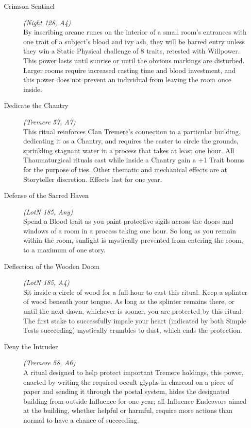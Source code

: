\begin{description}
	\item[Crimson Sentinel] \emph{(Night 128, A4)} \hfill \\
	By inscribing arcane runes on the interior of a small room's entrances with one trait of a subject's blood and 
	ivy ash, they will be barred entry unless they win a Static Physical challenge of 8 traits, retested with Willpower.  
	This power lasts until sunrise or until the obvious markings are disturbed.  Larger rooms require increased casting 
	time and blood investment, and this power does not prevent an individual from leaving the room once inside. \\

	\item[Dedicate the Chantry] \emph{(Tremere 57, A7)} \hfill \\
	This ritual reinforces Clan Tremere's connection to a particular building, dedicating it as a Chantry, and requires 
	the caster to circle the grounds, sprinkling stagnant water in a process that takes at least one hour. All 
	Thaumaturgical rituals cast while inside a Chantry gain a +1 Trait bonus for the purpose of ties. Other thematic 
	and mechanical effects are at Storyteller discretion.  Effects last for one year.\\

	\item[Defense of the Sacred Haven] \emph{(LotN 185, Any)} \hfill \\
	Spend a Blood trait as you paint protective sigils across the doors and windows of a room in a process taking one 
	hour.  So long as you remain within the room, sunlight is mystically prevented from entering the room, to a 
	maximum of one story. \\

	\item[Deflection of the Wooden Doom] \emph{(LotN 185, A4)} \hfill \\
	Sit inside a circle of wood for a full hour to cast this ritual.  Keep a splinter of wood beneath your tongue.  As 
	long as the splinter remains there, or until the next dawn, whichever is sooner, you are protected by this ritual.  
	The first stake to successfully impale your heart (indicated by both Simple Tests succeeding) mystically crumbles 
	to dust, which ends the protection. \\
	
	\item[Deny the Intruder] \emph{(Tremere 58, A6)} \hfill \\
	A ritual designed to help protect important Tremere holdings, this power, enacted by writing the required occult 
	glyphs in charcoal on a piece of paper and sending it through the postal system, hides the designated building 
	from outside Influence for one year; all Influence Endeavors aimed at the building, whether helpful or harmful, 
	require more actions than normal to have a chance of succeeding. \\
	

\end{description}

